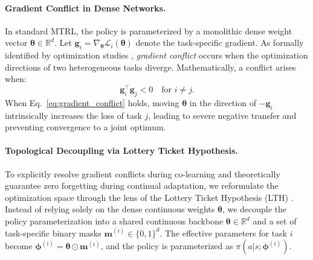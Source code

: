 \documentclass{article}
\begin{document}
\paragraph{Gradient Conflict in Dense Networks.} 
In standard MTRL, the policy is parameterized by a monolithic dense weight vector $\bm{\theta} \in \mathbb{R}^d$. 
Let $\bm{g}_i = \nabla_{\bm{\theta}} \mathcal{L}_i(\bm{\theta})$ denote the task-specific gradient. 
As formally identified by optimization studies \cite{i14}, \emph{gradient conflict} occurs when the optimization directions of two heterogeneous tasks diverge. Mathematically, a conflict arises when:
\begin{equation}
\bm{g}_i^\top \bm{g}_j < 0 \quad \text{for } i \neq j.
\label{eq:gradient_conflict}
\end{equation}
When Eq.~\ref{eq:gradient_conflict} holds, moving $\bm{\theta}$ in the direction of $-\bm{g}_i$ intrinsically increases the loss of task $j$, leading to severe negative transfer and preventing convergence to a joint optimum.

\paragraph{Topological Decoupling via Lottery Ticket Hypothesis.} 
To explicitly resolve gradient conflicts during co-learning and theoretically guarantee zero forgetting during continual adaptation, we reformulate the optimization space through the lens of the Lottery Ticket Hypothesis (LTH) \cite{n1}. 
Instead of relying solely on the dense continuous weights $\bm{\theta}$, we decouple the policy parameterization into a shared continuous backbone $\bm{\theta} \in \mathbb{R}^d$ and a set of task-specific binary masks $\bm{m}^{(i)} \in \{0, 1\}^d$. The effective parameters for task $i$ become $\bm{\phi}^{(i)} = \bm{\theta} \odot \bm{m}^{(i)}$, and the policy is parameterized as $\pi(a | s; \bm{\phi}^{(i)})$.
\end{document}
